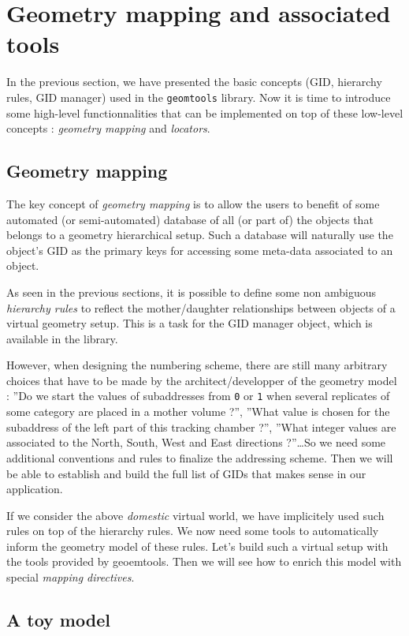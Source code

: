 

\section{Geometry mapping and associated tools}

\pn In the previous section, we have presented the basic concepts (GID, 
hierarchy rules, GID manager) used in the \texttt{geomtools} library.
Now it is time to introduce some high-level functionnalities that can be
implemented on top of these low-level concepts : \emph{geometry mapping}
and \emph{locators}.

\subsection{Geometry mapping}

The key concept of \emph{geometry mapping} is to allow the users to benefit
of some automated (or semi-automated) database of all (or part of) the 
objects that belongs to a geometry hierarchical setup. Such a database
will naturally use the object's GID as the primary keys for accessing some 
meta-data associated to an object.

As seen  in the previous sections,  it is possible to  define some non
ambiguous  \emph{hierarchy  rules}   to  reflect  the  mother/daughter
relationships between objects  of a virtual geometry setup.  This is a
task  for  the   GID  manager  object,  which  is   available  in  the
library. 

However,  when designing the  numbering scheme,  there are  still many
arbitrary choices that have to  be made by the architect/developper of
the geometry  model :  ''Do we start  the values of  subaddresses from
\texttt{0} or \texttt{1} when  several replicates of some category are
placed  in  a  mother volume  ?'',  ''What  value  is chosen  for  the
subaddress  of the  left part  of  this tracking  chamber ?'',  ''What
integer  values are  associated to  the  North, South,  West and  East
directions ?''\dots  So we need some additional  conventions and rules
to finalize the  addressing scheme. Then we will  be able to establish
and build the full list of GIDs that makes sense in our application.

If we consider the above \emph{domestic} virtual world, we have 
implicitely used such rules on top of the hierarchy rules. We now need
some tools to automatically inform the geometry model of these rules.
Let's build such a virtual setup with the tools provided
by geoemtools. Then we will see how to enrich this model
with special \emph{mapping directives}. 

\subsection{A toy model}

